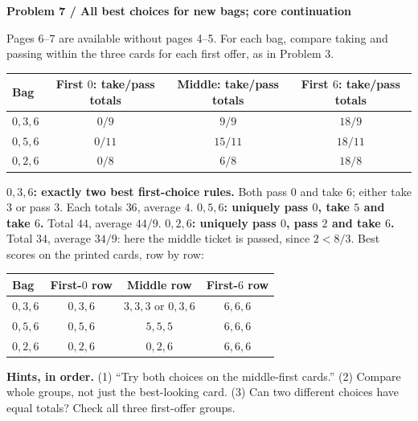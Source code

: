 \documentclass[11pt,letterpaper]{article}
\newcommand{\task}[2]{\par\textbf{Problem #1 / #2}\par}
\newcommand{\hint}[1]{\textbf{Hints, in order.} #1\par}
\begin{document}
\task{7}{All best choices for new bags; core continuation}
Pages 6--7 are available without pages 4--5. For each bag, compare taking and
passing within the three cards for each first offer, as in Problem 3.
\begin{center}\small
\begin{tabular}{@{}lccc@{}}\toprule
Bag & First $0$: take/pass totals & Middle: take/pass totals & First $6$: take/pass totals \\\midrule
$0,3,6$ & $0/9$ & $9/9$ & $18/9$ \\
$0,5,6$ & $0/11$ & $15/11$ & $18/11$ \\
$0,2,6$ & $0/8$ & $6/8$ & $18/8$ \\\bottomrule
\end{tabular}\end{center}
\textbf{$0,3,6$: exactly two best first-choice rules.} Both pass $0$ and take
$6$; either take $3$ or pass $3$. Each totals $36$, average $4$.
\textbf{$0,5,6$: uniquely pass $0$, take $5$ and take $6$.} Total $44$,
average $44/9$. \textbf{$0,2,6$: uniquely pass $0$, pass $2$ and take $6$.}
Total $34$, average $34/9$: here the middle ticket is passed, since $2<8/3$.
Best scores on the printed cards, row by row:
\begin{center}\small
\begin{tabular}{@{}lccc@{}}\toprule
Bag & First-$0$ row & Middle row & First-$6$ row \\\midrule
$0,3,6$ & $0,3,6$ & $3,3,3$ or $0,3,6$ & $6,6,6$ \\
$0,5,6$ & $0,5,6$ & $5,5,5$ & $6,6,6$ \\
$0,2,6$ & $0,2,6$ & $0,2,6$ & $6,6,6$ \\\bottomrule
\end{tabular}\end{center}
\hint{(1) ``Try both choices on the middle-first cards.''
(2) Compare whole groups, not just the best-looking card.
(3) Can two different choices have equal totals? Check all three first-offer groups.}
\end{document}

